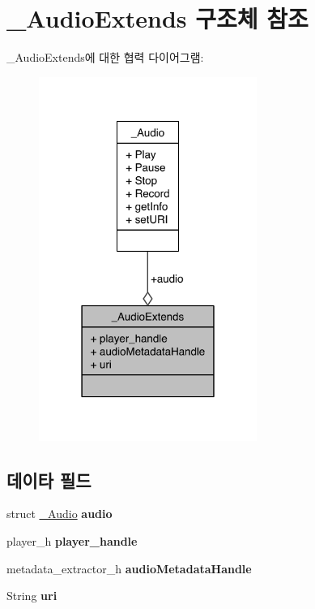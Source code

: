 \hypertarget{struct___audio_extends}{\section{\-\_\-\-Audio\-Extends 구조체 참조}
\label{struct___audio_extends}
}


\-\_\-\-Audio\-Extends에 대한 협력 다이어그램\-:\nopagebreak
\begin{figure}[H]
\begin{center}
\leavevmode
\includegraphics[width=202pt]{struct___audio_extends__coll__graph}
\end{center}
\end{figure}
\subsection*{데이타 필드}
\begin{DoxyCompactItemize}
\item 
\hypertarget{struct___audio_extends_a5fd9dfc5896f2475249e5814bc957cd3}{struct \hyperlink{struct___audio}{\-\_\-\-Audio} {\bfseries audio}}\label{struct___audio_extends_a5fd9dfc5896f2475249e5814bc957cd3}

\item 
\hypertarget{struct___audio_extends_acdbf0738be9fa70a60412d48cad881ee}{player\-\_\-h {\bfseries player\-\_\-handle}}\label{struct___audio_extends_acdbf0738be9fa70a60412d48cad881ee}

\item 
\hypertarget{struct___audio_extends_afb8274c680a31f19a7967b768e11ba52}{metadata\-\_\-extractor\-\_\-h {\bfseries audio\-Metadata\-Handle}}\label{struct___audio_extends_afb8274c680a31f19a7967b768e11ba52}

\item 
\hypertarget{struct___audio_extends_ac0b02717b928a36338653c49b0821365}{String {\bfseries uri}}\label{struct___audio_extends_ac0b02717b928a36338653c49b0821365}

\end{DoxyCompactItemize}


